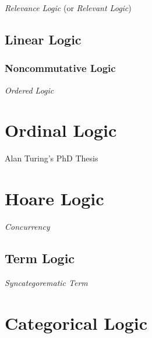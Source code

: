 \emph{Relevance Logic} (or \emph{Relevant Logic})



\subsection{Linear Logic}\label{sec:linear_logic}

\subsubsection{Noncommutative Logic}\label{sec:noncommutative_logic}

\emph{Ordered Logic}



\section{Ordinal Logic}\label{sec:ordinal_logic}

Alan Turing's PhD Thesis \cite{turing38}



\section{Hoare Logic}\label{sec:hoare_logic}

\emph{Concurrency}



\subsection{Term Logic}\label{sec:term_logic}

\emph{Syncategorematic Term}



\section{Categorical Logic}\label{sec:categorical_logic}



